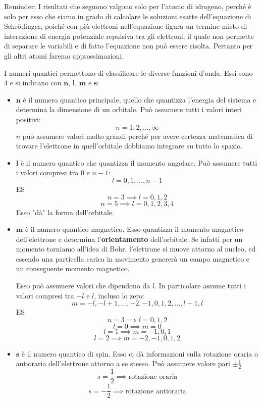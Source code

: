 Reminder: I risultati che seguono valgono solo per l'atomo di idrogeno, perché è solo per esso che siamo in grado di calcolare le soluzioni esatte dell'equazione di Schrödinger, poiché con più elettroni nell'equazione figura un termine misto di interazione di energia potenziale repulsiva tra gli elettroni, il quale non permette di separare le variabili e di fatto l'equazione non può essere risolta. Pertanto per gli altri atomi faremo approssimazioni.

I numeri quantici permettono di classificare le diverse funzioni d'onda. Essi sono 4 e si indicano con $\boldsymbol{n}$, $\boldsymbol{l}$, $\boldsymbol{m}$ e $\boldsymbol{s}$:
\begin{itemize}
  \item $\boldsymbol{n}$ è il numero quantico principale, quello che quantizza l'energia del sistema e determina la dimensione di un orbitale.
  Può assumere tutti i valori interi positivi:
  $${n=1,2,\dots,\infty}$$
  $n$ può assumere valori molto grandi perché per avere certezza matematica di trovare l'elettrone in quell'orbitale dobbiamo integrare su tutto lo spazio.
  \item $\boldsymbol{l}$ è il numero quantico che quantizza il momento angolare. Può assumere tutti i valori compresi tra 0 e $n-1$:
  $$l=0,1,\dots,n-1$$
  ES
  $$n=3 \implies l=0,1,2$$
  $$n=5 \implies l=0,1,2,3,4$$
  Esso "dà" la forma dell'orbitale.
  \item $\boldsymbol{m}$ è il numero quantico magnetico. Esso quantizza il momento magnetico dell'elettrone e determina l'\textbf{orientamento} dell'orbitale. Se infatti per un momento torniamo all'idea di Bohr, l'elettrone si muove attorno al nucleo, ed essendo una particella carica in movimento genererà un campo magnetico e un conseguente momento magnetico.
  
  Esso può assumere valori che dipendono da $l$. In particolare assume tutti i valori compresi tra $-l$ e $l$, incluso lo zero:
  $$m=-l,-l+1,\dots,-2,-1,0,1,2,\dots,l-1,l$$
  ES 
  $$n=3 \implies l=0,1,2$$
  $$l=0 \implies m=0$$
  $$l=1 \implies m=-1,0,1$$
  $$l=2 \implies m=-2,-1,0,1,2$$
  \item $\boldsymbol{s}$ è il numero quantico di spin. Esso ci dà informazioni sulla rotazione oraria o antioraria dell'elettrone attorno a se stesso. Può assumere valore pari $\pm\frac{1}{2}$
  $$s=\frac{1}{2}\implies \text{rotazione oraria}$$
  $$s=-\frac{1}{2}\implies \text{rotazione antioraria}$$
\end{itemize}

